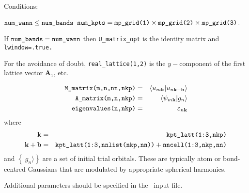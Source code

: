 Conditions:
\begin{itemize}
\cond $\verb#num_wann# \le \verb#num_bands#$
\cond $\verb#num_kpts# = \verb#mp_grid(1)# \times \verb#mp_grid(2)#
\times \verb#mp_grid(3)#$.
\end{itemize}

If $\verb#num_bands# = \verb#num_wann#$ then \verb#U_matrix_opt# is the identity matrix and
\verb#lwindow=.true.#

For the avoidance of doubt, \verb#real_lattice(1,2)# is the
$y-$component of the first lattice
vector $\mathbf{A}_{1}$, etc.

\begin{eqnarray*}
\verb#M_matrix(m,n,nn,nkp)# & = & \left\langle u_{m\mathbf{k}} |
u_{n\mathbf{k+b}}\right\rangle\\
\verb#A_matrix(m,n,nkp)# & = &
\left\langle \psi_{m\mathbf{k}}|g_{n}\right\rangle\\
\verb#eigenvalues(n,nkp)# &=& \varepsilon_{n\mathbf{k}}
\end{eqnarray*}
where
\begin{eqnarray*}
\mathbf{k} &=&\verb#kpt_latt(1:3,nkp)#\\
\mathbf{k+b}&=& \verb#kpt_latt(1:3,nnlist(nkp,nn))# +
\verb#nncell(1:3,nkp,nn)#
\end{eqnarray*}
and
$\left\{|g_{n}\rangle\right\}$ are a set of initial trial
orbitals. These are
typically atom or bond-centred Gaussians that are modulated by
appropriate spherical harmonics.

Additional parameters should be specified in the \wannier\ input
file.
